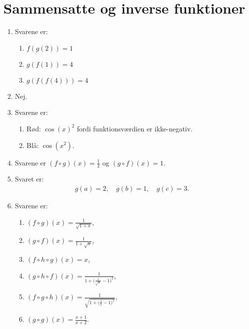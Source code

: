 \section{Sammensatte og inverse funktioner}

\begin{enumerate}
	
	\item Svarene er:
	\begin{enumerate}
		\item $f(g(2))=1$
		\item $g(f(1))=4$
		\item $g(f(f(4)))=4$
	\end{enumerate}
	
	\item Nej.
	
	\item Svarene er:
	\begin{enumerate}
		\item Rød: $\cos(x)^2$ fordi funktionsværdien er ikke-negativ.
		\item Blå: $\cos(x^2)$.
	\end{enumerate}
	
	
	\item Svarene er $ (f\circ g)(x)= \frac{1}{2}$ og $ (g\circ f)(x)=1 $.
	
	\item Svaret er:
	\begin{align*}
	g(a)=2,\quad g(b)=1,\quad g(c)=3.
	\end{align*}
	
	\item Svarene er:
	\begin{enumerate}
		\item $(f\circ g)(x)=\frac{1}{\sqrt{1+x}}$,
		\item $(g\circ f)(x)=\frac{1}{1+\sqrt{x}}$,
		\item $(f\circ h\circ g)(x)=x$,
		\item $(g\circ h \circ f)(x)=\frac{1}{1+\Big(\frac{1}{\sqrt{x}}-1 \Big)^{2}}$,
		\item $ (f\circ g \circ h )(x)=\frac{1}{\sqrt{1+\Big(\frac{1}{x}-1 \Big)^{2}}}$,
		\item $(g\circ g)(x)=\frac{x+1}{x+2}$.
	\end{enumerate}
	

\end{enumerate}
